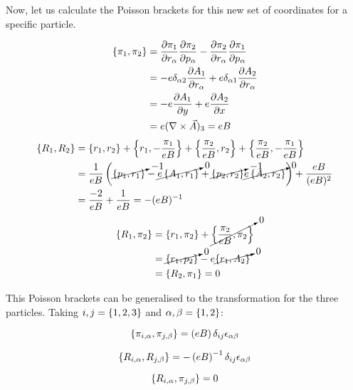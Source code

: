 Now, let us calculate the Poisson brackets for this new set of coordinates for a specific particle.

\begin{align*}
\left\lbrace \pi_1, \pi_2 \right\rbrace &= \frac{\partial \pi_1}{\partial r_{\alpha}}\frac{\partial \pi_2}{\partial p_{\alpha}} - \frac{\partial \pi_2}{\partial r_{\alpha}}\frac{\partial \pi_1}{\partial p_{\alpha}}\\
&= -e\delta_{\alpha 2}\frac{\partial A_1}{\partial r_{\alpha}} +e\delta_{\alpha 1}\frac{\partial A_2}{\partial r_{\alpha}}\\
&= -e\frac{\partial A_1}{\partial y}  + e\frac{\partial A_2}{\partial x}\\
&= e(\nabla \times \vec{A})_3 = eB
\end{align*}
\begin{align*}
\left\lbrace R_1, R_2 \right\rbrace &= \left\lbrace r_1, r_2 \right\rbrace + \left\lbrace r_1, -\frac{\pi_1}{eB} \right\rbrace +\left\lbrace \frac{\pi_2}{eB}, r_2 \right\rbrace + \left\lbrace \frac{\pi_2}{eB}, -\frac{\pi_1}{eB} \right\rbrace\\
&= \frac{1}{eB}\left( \cancelto{-1}{\left\lbrace p_1, r_1 \right\rbrace}- \cancelto{0}{e\left\lbrace A_1, r_1 \right\rbrace}+\cancelto{-1}{\left\lbrace p_2, r_2 \right\rbrace} \cancelto{0}{e\left\lbrace A_2, r_2 \right\rbrace} \right) +\frac{eB}{(eB)^2}\\
&= \frac{-2}{eB}+ \frac{1}{eB} = -(eB)^{-1}
\end{align*}
\begin{align*}
\left\lbrace R_{1}, \pi_{2} \right\rbrace &= \left\lbrace r_1, \pi_2 \right\rbrace+\cancelto{0}{\left\lbrace \frac{\pi_2}{eB}, \pi_2 \right\rbrace}\\
&= \cancelto{0}{\left\lbrace r_1, p_2 \right\rbrace}-e\cancelto{0}{\left\lbrace r_1, A_2 \right\rbrace}\\
&= \left\lbrace R_2, \pi_1 \right\rbrace = 0
\end{align*}

This Poisson brackets can be generalised to the transformation for the three particles. Taking $i,j = \left\lbrace 1,2, 3 \right\rbrace$ and $\alpha,\beta=\left\lbrace 1, 2 \right\rbrace$:

\begin{equation}
\left\lbrace \pi_{i,\alpha}, \pi_{j,\beta} \right\rbrace=\left( eB \right)\delta_{ij}\epsilon_{\alpha \beta}  
\label{eq:pb1}
\end{equation}

\begin{equation}
\left\lbrace R_{i,\alpha}, R_{j,\beta} \right\rbrace= -\left( eB \right)^{-1} \delta_{ij}\epsilon_{\alpha \beta}  
\label{eq:pb2}
\end{equation}

\begin{equation}
\left\lbrace R_{i,\alpha}, \pi_{j,\beta} \right\rbrace=0 
\label{eq:pb3} 
\end{equation}


